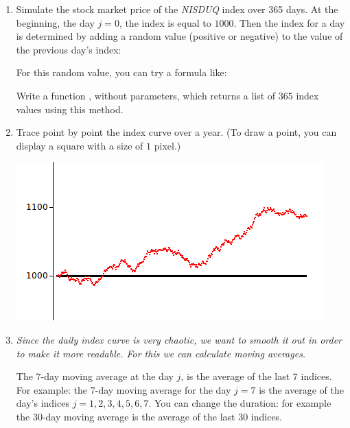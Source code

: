 \documentclass[11pt,class=report,crop=false]{standalone}
\begin{document}
\begin{activite}



\begin{enumerate}
  \item Simulate the stock market price of the \emph{NISDUQ} index over 365 days.
  At the beginning, the day $j=0$, the index is equal to $1000$. Then the index for a day is determined by adding a random value (positive or negative) to the value of the previous day's index:  
  
  For this random value, you can try a formula like:  
  
  Write a function , without parameters, which returns a list of $365$ index values using this method.
  
  \item Trace point by point the index curve over a year. (To draw a point, you can display a square with a size of $1$ pixel.)
  
\begin{center}
\includegraphics[scale=\myscale,scale=0.7]{screen-stat-5a}
\end{center}

   \item \emph{Since the daily index curve is very chaotic, we want to smooth it out in order to make it more readable. For this we can calculate moving averages.}
   
   The $7$-day moving average at the day $j$, is the average of the last $7$ indices. For example: the $7$-day moving average for the day $j = 7$ is the average of the day's indices $j=1,2,3,4,5,6,7$. You can change the duration: for example the $30$-day moving average is the average of the last $30$ indices.
   

\end{enumerate}
\end{activite}
\end{document}

